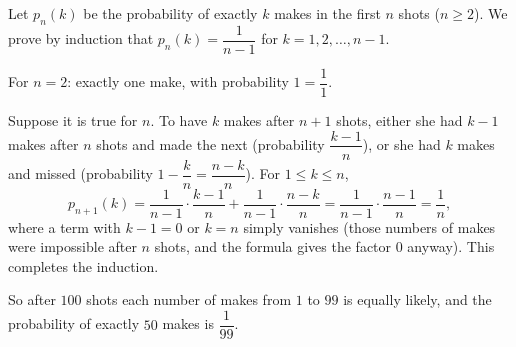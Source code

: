 Let $p_n(k)$ be the probability of exactly $k$ makes in the first $n$ shots ($n\ge2$). We prove by induction that $p_n(k)=\dfrac{1}{n-1}$ for $k=1,2,\dots,n-1$.

For $n=2$: exactly one make, with probability $1=\dfrac11$.

Suppose it is true for $n$. To have $k$ makes after $n+1$ shots, either she had $k-1$ makes after $n$ shots and made the next (probability $\dfrac{k-1}{n}$), or she had $k$ makes and missed (probability $1-\dfrac kn=\dfrac{n-k}{n}$). For $1\le k\le n$,
\[p_{n+1}(k)=\dfrac1{n-1}\cdot\dfrac{k-1}{n}+\dfrac1{n-1}\cdot\dfrac{n-k}{n}=\dfrac{1}{n-1}\cdot\dfrac{n-1}{n}=\dfrac1n,\]
where a term with $k-1=0$ or $k=n$ simply vanishes (those numbers of makes were impossible after $n$ shots, and the formula gives the factor $0$ anyway). This completes the induction.

So after $100$ shots each number of makes from $1$ to $99$ is equally likely, and the probability of exactly $50$ makes is $\boxed{\dfrac1{99}}$.
